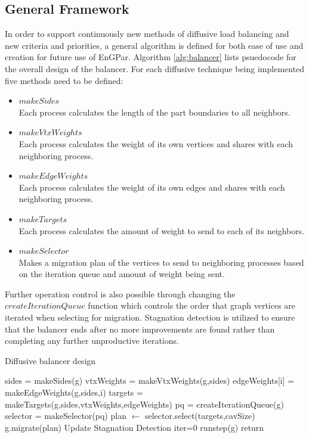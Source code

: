 \documentclass[a4paper]{article}
\begin{document}
\subsection{General Framework}
In order to support continuously new methods of diffusive load balancing and new criteria and priorities, a general algorithm is defined for both ease of use and creation for future use of EnGPar. Algorithm \ref{alg:balancer} lists psuedocode for the overall design of the balancer. For each diffusive technique being implemented five methods need to be defined:
\begin{itemize}
  \item $makeSides$\\
    Each process calculates the length of the part boundaries to all neighbors.
  \item $makeVtxWeights$ \\
    Each process calculates the weight of its own vertices and shares with each neighboring process.
  \item $makeEdgeWeights$ \\
    Each process calculates the weight of its own edges and shares with each neighboring process.
  \item $makeTargets$\\
    Each process calculates the amount of weight to send to each of its neighbors.
  \item $makeSelector$\\
    Makes a migration plan of the vertices to send to neighboring processes based on the iteration queue and amount of weight being sent.
\end{itemize}
Further operation control is also possible through changing the $createIterationQueue$ function which controls the order that graph vertices are iterated when selecting for migration. Stagnation detection is utilized to ensure that the balancer ends after no more improvements are found rather than completing any further unproductive iterations.

\begin{algorithm}
\caption{Diffusive balancer design}\label{alg:balancer}
\begin{algorithmic}
  \State sides = makeSides(g)
  \State vtxWeights = makeVtxWeights(g,sides)
  \State edgeWeights[i] = makeEdgeWeights(g,sides,i)
  \EndFor
  \State targets = makeTargets(g,sides,vtxWeights,edgeWeights)
  \State pq = createIterationQueue(g)
  \State selector = makeSelector(pq)
  \State plan $\leftarrow$ selector.select(targets,cavSize)
  \EndFor
  \State g.migrate(plan)
  \State Update Stagnation Detection
  \EndProcedure
  \State iter=0
  \State runstep(g)
  \State return
  \EndIf
  \EndFor
  \EndProcedure
\end{algorithmic}
\end{algorithm}
\end{document}
